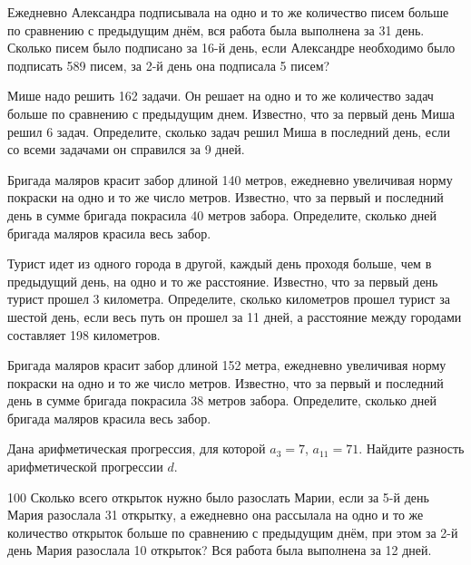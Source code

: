 \documentclass[4apaper]{article}
\begin{document}
\begin{taskBN}{94}
Ежедневно Александра подписывала на одно и то же количество писем больше по сравнению с предыдущим днём, вся работа была выполнена за 31 день. Сколько писем было подписано за 16-й день, если Александре необходимо было подписать 589 писем, за 2-й день она подписала 5 писем? 
\end{taskBN}

\begin{taskBN}{95}
Мише надо решить 162 задачи. Он решает на одно и то же количество задач больше по сравнению с предыдущим днем. Известно, что за первый день Миша решил 6 задач. Определите, сколько задач решил Миша в последний день, если со всеми задачами он справился за 9 дней.
\end{taskBN}

\begin{taskBN}{96}
 Бригада маляров красит забор длиной 140 метров, ежедневно увеличивая норму покраски на одно и то же число метров. Известно, что за первый и последний день в сумме бригада покрасила 40 метров забора.  Определите, сколько дней бригада маляров красила весь забор. 
\end{taskBN}

\begin{taskBN}{97}
Турист идет из одного города в другой, каждый день проходя больше, чем в предыдущий день, на одно и то же расстояние. Известно, что за первый день турист прошел 3 километра. Определите, сколько километров прошел турист за шестой день, если весь путь он прошел за 11 дней, а расстояние между городами составляет 198 километров.
\end{taskBN}

\begin{taskBN}{98}
 Бригада маляров красит забор длиной 152 метра, ежедневно увеличивая норму покраски на одно и то же число метров. Известно, что за первый и последний день в сумме бригада покрасила 38 метров забора.  Определите, сколько дней бригада маляров красила весь забор. 
\end{taskBN}

\begin{taskBN}{99}
Дана арифметическая прогрессия, для которой $a_{3} = 7$, $a_{11} = 71$. Найдите разность арифметической прогрессии $d$.
\end{taskBN}

\begin{taskBN}{100}
Сколько всего открыток нужно было разослать Марии, если за 5-й день Мария разослала 31 открытку, а ежедневно она рассылала на одно и то же количество открыток больше по сравнению с предыдущим днём, при этом за 2-й день Мария разослала 10 открыток? Вся работа была выполнена за 12 дней. 
\end{taskBN}
\end{document}
